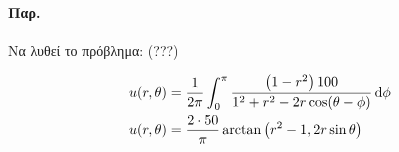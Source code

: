 \documentclass[12pt,a4paper,notitlepage,fleqn]{article}
\begin{document}
    \paragraph{Παρ.}
    Να λυθεί το πρόβλημα: (???)
    
    \begin{align*}
    	u(r,\theta) &= \frac{1}{2\pi} \int_{0}^{\pi}
    	\frac{\left(1-r^2\right)100}{1^2+r^2-2r\cos(\theta-\phi)}\mathop{}\!\mathrm{d}\phi
    	\\
    	u(r,\theta) &= \frac{2\cdot 50}{\pi} \arctan\left(r^2-1,2r\sin\theta\right)
    \end{align*}
    
    \paragraph{}
\end{document}
